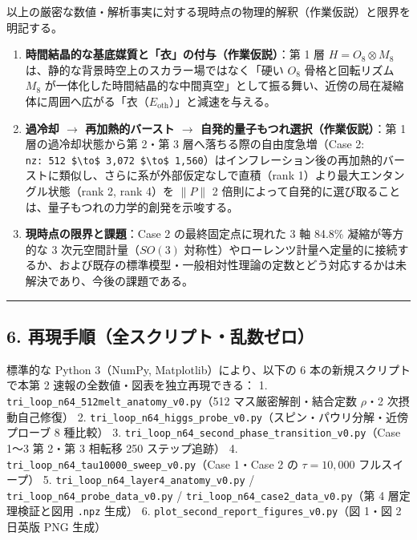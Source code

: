 \documentclass[
  a4paper,
]{ltjsarticle}
\providecommand{\tightlist}{%
  \setlength{\itemsep}{0pt}\setlength{\parskip}{0pt}}
\begin{document}
以上の厳密な数値・解析事実に対する現時点の物理的解釈（作業仮説）と限界を明記する。

\begin{enumerate}
\def\labelenumi{\arabic{enumi}.}
\tightlist
\item
  \textbf{時間結晶的な基底媒質と「衣」の付与（作業仮説）}：第 1 層
  \(H = O_8 \otimes M_8\) は、静的な背景時空上のスカラー場ではなく「硬い
  \(O_8\) 骨格と回転リズム \(M_8\)
  が一体化した時間結晶的な中間真空」として振る舞い、近傍の局在凝縮体に周囲へ広がる「衣（\(E_{\mathrm{oth}}\)）」と減速を与える。
\item
  \textbf{過冷却 \(\to\) 再加熱的バースト \(\to\)
  自発的量子もつれ選択（作業仮説）}：第 1 層の過冷却状態から第 2・第 3
  層へ落ちる際の自由度急増（Case 2:
  \texttt{nz:\ 512\ \$\textbackslash{}to\$\ 3,072\ \$\textbackslash{}to\$\ 1,560}）はインフレーション後の再加熱的バーストに類似し、さらに系が外部仮定なしで直積（rank
  1）より最大エンタングル状態（rank 2, rank 4）を \(\|P\|\) 2
  倍則によって自発的に選び取ることは、量子もつれの力学的創発を示唆する。
\item
  \textbf{現時点の限界と課題}：Case 2 の最終固定点に現れた 3 軸 84.8\%
  凝縮が等方的な 3 次元空間計量（\(SO(3)\)
  対称性）やローレンツ計量へ定量的に接続するか、および既存の標準模型・一般相対性理論の定数とどう対応するかは未解決であり、今後の課題である。
\end{enumerate}

\begin{center}\rule{0.5\linewidth}{0.5pt}\end{center}

\subsection{6.
再現手順（全スクリプト・乱数ゼロ）}\label{ux518dux73feux624bux9806ux5168ux30b9ux30afux30eaux30d7ux30c8ux4e71ux6570ux30bcux30ed}

標準的な Python 3（NumPy, Matplotlib）により、以下の 6
本の新規スクリプトで本第 2 速報の全数値・図表を独立再現できる： 1.
\texttt{tri\_\allowbreak{}loop\_\allowbreak{}n64\_\allowbreak{}512melt\_\allowbreak{}anatomy\_\allowbreak{}v0.py}（512
マス厳密解剖・結合定数 \(\rho\)・2 次摂動自己修復） 2.
\texttt{tri\_\allowbreak{}loop\_\allowbreak{}n64\_\allowbreak{}higgs\_\allowbreak{}probe\_\allowbreak{}v0.py}（スピン・パウリ分解・近傍プローブ
8 種比較） 3.
\texttt{tri\_\allowbreak{}loop\_\allowbreak{}n64\_\allowbreak{}second\_\allowbreak{}phase\_\allowbreak{}transition\_\allowbreak{}v0.py}（Case 1〜3 第
2・第 3 相転移 250 ステップ追跡） 4.
\texttt{tri\_\allowbreak{}loop\_\allowbreak{}n64\_\allowbreak{}tau10000\_\allowbreak{}sweep\_\allowbreak{}v0.py}（Case 1・Case 2 の
\(\tau = 10,000\) フルスイープ） 5.
\texttt{tri\_\allowbreak{}loop\_\allowbreak{}n64\_\allowbreak{}layer4\_\allowbreak{}anatomy\_\allowbreak{}v0.py} /
\texttt{tri\_\allowbreak{}loop\_\allowbreak{}n64\_\allowbreak{}probe\_\allowbreak{}data\_\allowbreak{}v0.py} /
\texttt{tri\_\allowbreak{}loop\_\allowbreak{}n64\_\allowbreak{}case2\_\allowbreak{}data\_\allowbreak{}v0.py}（第 4 層定理検証と図用
\texttt{.npz} 生成） 6.
\texttt{plot\_\allowbreak{}second\_\allowbreak{}report\_\allowbreak{}figures\_\allowbreak{}v0.py}（図 1・図 2 日英版 PNG
生成）
\end{document}
